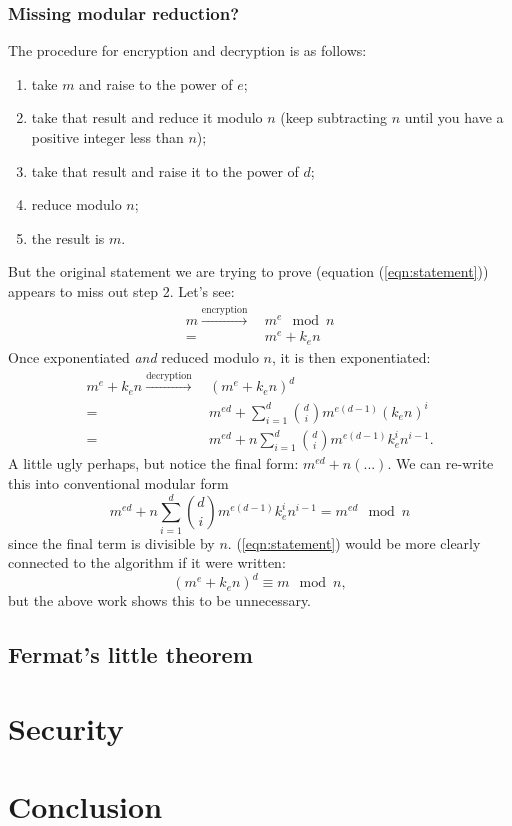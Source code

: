 \documentclass[]{scrartcl}
\theoremstyle{definition}
\let\oldref\ref
\renewcommand{\ref}[1]{(\oldref{#1})}
\begin{document}
\subsubsection{Missing modular reduction?}
The procedure for encryption and decryption is as follows:
\begin{enumerate}
    \item take $m$ and raise to the power of $e$;
    \item take that result and reduce it modulo $n$ (keep subtracting $n$ until you have a positive integer less than $n$);
    \item take that result and raise it to the power of $d$;
    \item reduce modulo $n$;
    \item the result is $m$.
\end{enumerate}
But the original statement we are trying to prove (equation \ref{eqn:statement}) appears to miss out step 2. Let's see:
\begin{align*}
    m \xrightarrow{\text{encryption}} &\,m^e \mod n \\
    =&\,m^e + k_en
\end{align*}
Once exponentiated \textit{and} reduced modulo $n$, it is then exponentiated:
\begin{align*}
    m^e + k_en \xrightarrow{\text{decryption}} &\,(m^e + k_en)^d \\
    =&\,m^{ed} + \sum_{i=1}^{d}\binom{d}{i} m^{e(d-1)}(k_en)^i \\
    =&\,m^{ed} + n\sum_{i=1}^{d}\binom{d}{i} m^{e(d-1)}k_e^in^{i-1}.
\end{align*}
A little ugly perhaps, but notice the final form: $m^{ed} + n(...)$. We can re-write this into conventional modular form
\begin{equation*}
    m^{ed} + n\sum_{i=1}^{d}\binom{d}{i} m^{e(d-1)}k_e^in^{i-1} = m^{ed} \mod n
\end{equation*}
since the final term is divisible by $n$. \ref{eqn:statement} would be more clearly connected to the algorithm if it were written:
\begin{equation*}
    (m^e + k_en)^d \equiv m \mod n,
\end{equation*}
but the above work shows this to be unnecessary.

\subsection{Fermat's little theorem}

\section{Security}

\section{Conclusion}
\end{document}
